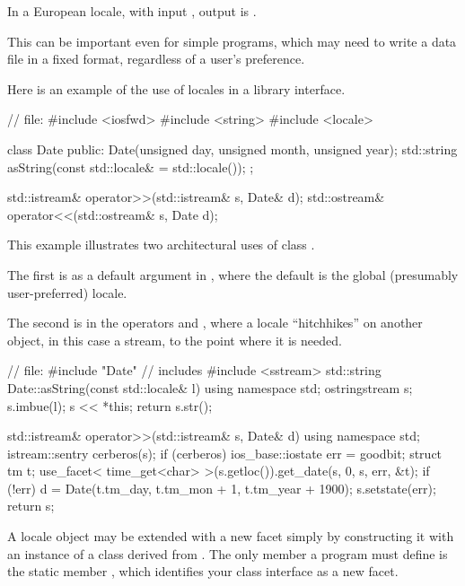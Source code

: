 In a European locale, with input
,
output is
.
\exitexample

\pnum
This can be important even for simple programs, which may need to
write a data file in a fixed format, regardless of a user's preference.

\pnum
\enterexample
Here is an example of the use of locales in a library interface.

\begin{codeblock}
// file: 
#include <iosfwd>
#include <string>
#include <locale>

class Date {
public:
  Date(unsigned day, unsigned month, unsigned year);
  std::string asString(const std::locale& = std::locale());
};

std::istream& operator>>(std::istream& s, Date& d);
std::ostream& operator<<(std::ostream& s, Date d);
\end{codeblock}

\pnum
This example illustrates two architectural uses of class
.

\pnum
The first is as a default argument in
,
where the
default is the global (presumably user-preferred) locale.

\pnum
The second is in the operators
\tcode{\shl}
and
\tcode{\shr},
where a locale ``hitchhikes''
on another object, in this case a stream, to the point where it
is needed.

\begin{codeblock}
// file: 
#include "Date"                 // includes 
#include <sstream>
std::string Date::asString(const std::locale& l) {
  using namespace std;
  ostringstream s; s.imbue(l);
  s << *this; return s.str();
}

std::istream& operator>>(std::istream& s, Date& d) {
  using namespace std;
  istream::sentry cerberos(s);
  if (cerberos) {
    ios_base::iostate err = goodbit;
    struct tm t;
    use_facet< time_get<char> >(s.getloc()).get_date(s, 0, s, err, &t);
    if (!err) d = Date(t.tm_day, t.tm_mon + 1, t.tm_year + 1900);
    s.setstate(err);
  }
  return s;
}
\end{codeblock}
\exitexample

\pnum
A locale object may be extended with a new facet simply by constructing
it with an instance of a class derived from
.
The only member a \Cpp program must define is the static member
,
which identifies your class interface as a new facet.

